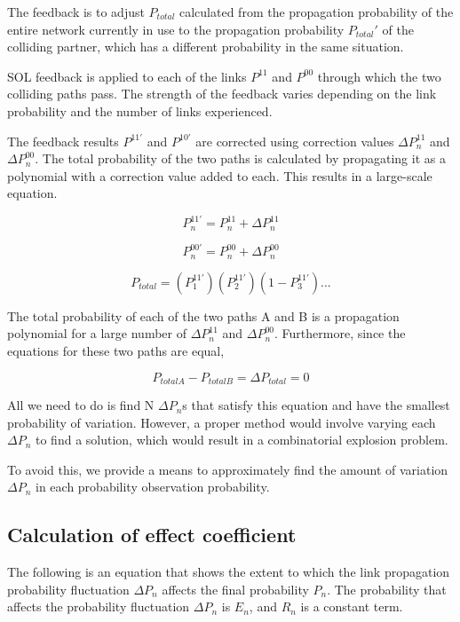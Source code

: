 \documentclass[12pt]{article}
\begin{document}
The feedback is to adjust \(P_{total}\) calculated from the propagation
probability of the entire network currently in use to the propagation
probability \(P_{total}'\) of the colliding partner, which has a
different probability in the same situation.

SOL feedback is applied to each of the links \(P^{11}\) and \(P^{00}\)
through which the two colliding paths pass. The strength of the feedback
varies depending on the link probability and the number of links
experienced.

The feedback results \(P^{11'}\) and \(P^{10'}\) are corrected using
correction values \hspace{0pt}\hspace{0pt}\(\Delta P^{11}_n\) and
\(\Delta P^{00}_n\). The total probability of the two paths is
calculated by propagating it as a polynomial with a correction value
added to each. This results in a large-scale equation.

\[ P^{11'}_n=P^{11}_n+\Delta P^{11}_n \]

\[ P^{00'}_n=P^{00}_n+\Delta P^{00}_n \]

\[ P_{total}=(P^{11'}_1)(P^{11'}_2)(1-P^{11'}_3)... \]

The total probability of each of the two paths A and B is a propagation
polynomial for a large number of \(\Delta P^{11}_n\) and
\(\Delta P^{00}_n\). Furthermore, since the equations for these two
paths are equal,

\[ P_{totalA}-P_{totalB}=\Delta P_{total}=0 \]

All we need to do is find N \(\Delta P_{n}\)s that satisfy this equation
and have the smallest probability of variation. However, a proper method
would involve varying each \(\Delta P_{n}\) to find a solution, which
would result in a combinatorial explosion problem.

To avoid this, we provide a means to approximately find the amount of
variation \(\Delta P_{n}\) in each probability observation probability.

\subsection{Calculation of effect coefficient}\label{calculation-of-effect-coefficient-e_n}

The following is an equation that shows the extent to which the link
propagation probability fluctuation \(\Delta P_n\) affects the final
probability \(P_n\). The probability that affects the probability
fluctuation \(\Delta P_n\) is \(E_n\), and \(R_n\) is a constant term.
\end{document}
